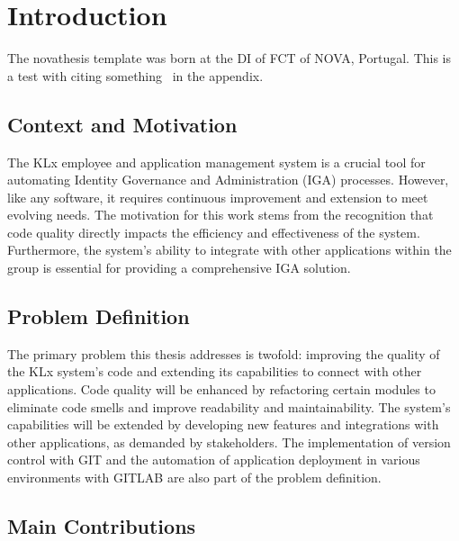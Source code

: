 
%

\chapter{Introduction}
\label{cha:introduction}



The \gls{novathesis} template was born at the \gls{DI} of  \gls{FCT} of \gls{NOVA}, Portugal. This is a test with citing something~\cite{ecoop12-dias} in the appendix.

\section{Context and Motivation}

The KLx employee and application management system is a crucial tool for automating Identity Governance and Administration (IGA) processes. However, like any software, it requires continuous improvement and extension to meet evolving needs. The motivation for this work stems from the recognition that code quality directly impacts the efficiency and effectiveness of the system. Furthermore, the system’s ability to integrate with other applications within the group is essential for providing a comprehensive IGA solution.

\section{Problem Definition}

The primary problem this thesis addresses is twofold: improving the quality of the KLx system’s code and extending its capabilities to connect with other applications. Code quality will be enhanced by refactoring certain modules to eliminate code smells and improve readability and maintainability. The system’s capabilities will be extended by developing new features and integrations with other applications, as demanded by stakeholders. The implementation of version control with GIT and the automation of application deployment in various environments with GITLAB are also part of the problem definition.

\section{Main Contributions}

